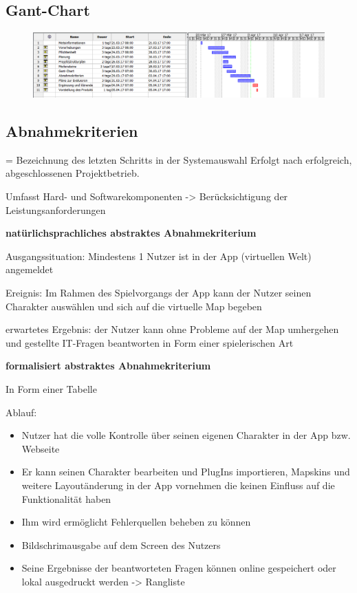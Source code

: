 \subsection{Gant-Chart}

\begin{figure}
	\centering
	\includegraphics[width=1.8\linewidth]{screenshot002}
	\caption{}
	\label{fig:screenshot002}
\end{figure}


\subsection{Abnahmekriterien}


= Bezeichnung des letzten Schritts in der Systemauswahl
Erfolgt nach erfolgreich, abgeschlossenen Projektbetrieb.

Umfasst Hard- und Softwarekomponenten -> Berücksichtigung der Leistungsanforderungen

\textbf {natürlichsprachliches abstraktes Abnahmekriterium}

Ausgangssituation:
Mindestens 1 Nutzer ist in der App (virtuellen Welt) angemeldet

Ereignis:
Im Rahmen des Spielvorgangs der App kann der Nutzer seinen Charakter auswählen und sich auf die virtuelle Map begeben

erwartetes Ergebnis:
der Nutzer kann ohne Probleme auf der Map umhergehen und gestellte IT-Fragen beantworten in Form einer spielerischen Art


\textbf {formalisiert abstraktes Abnahmekriterium}

In Form einer Tabelle

Ablauf:

\begin{itemize}
	\item Nutzer hat die volle Kontrolle über seinen eigenen Charakter in der App bzw. Webseite

	\item Er kann seinen Charakter bearbeiten und PlugIns importieren, Mapskins und weitere Layoutänderung in der App vornehmen die       keinen Einfluss auf die Funktionalität haben
		
	\item Ihm wird ermöglicht Fehlerquellen beheben zu können 

	\item Bildschrimausgabe auf dem Screen des Nutzers
	
	\item Seine Ergebnisse der beantworteten Fragen können online
	gespeichert oder lokal ausgedruckt werden -> Rangliste 
		 
\end{itemize}

